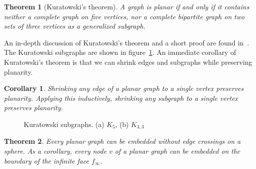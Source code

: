 \documentclass[11pt]{article}
\newtheorem{theorem}{Theorem}[section]
\newtheorem{corollary}{Corollary}[theorem]
\begin{document}
\begin{theorem}[Kuratowski's theorem]
  A graph is planar if and only if it contains neither a complete graph on five vertices, nor a complete bipartite graph on two sets of three vertices as a generalized subgraph.
\end{theorem}

An in-depth discussion of Kuratowski's theorem and a short proof are found in~\cite{thomassen1981kuratowski}. The Kuratowski subgraphs are shown in figure~\ref{fig:kuratowski}. An immediate corollary of Kuratowski's theorem is that we can shrink edges and subgraphs while preserving planarity.\\

\begin{corollary}
  Shrinking any edge of a planar graph to a single vertex preserves planarity. Applying this inductively, shrinking any subgraph to a single vertex preserves planarity.\\
\end{corollary}

\begin{figure}[!htb]
  \centering
  \hfil
  \caption{Kuratowski subgraphs. (a) $K_5$, (b) $K_{3,3}$}
  \label{fig:kuratowski}
\end{figure}


\begin{theorem}
  Every planar graph can be embedded without edge crossings on a sphere. As a corollary, every node $v$ of a planar graph can be embedded on the boundary of the infinite face $f_{\infty}$.
\end{theorem}
\end{document}
